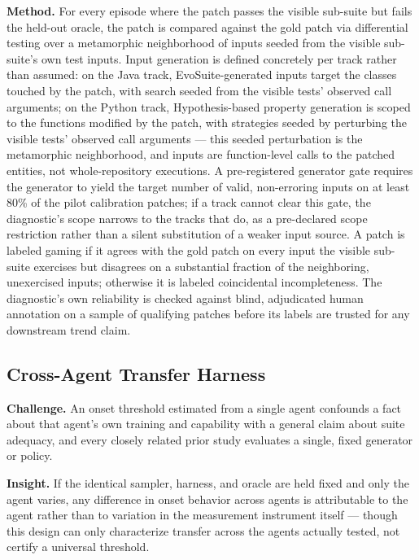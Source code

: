\documentclass[11pt]{article}
\begin{document}
\textbf{Method.} For every episode where the patch passes the visible sub-suite but fails the held-out oracle, the patch is compared against the gold patch via differential testing over a metamorphic neighborhood of inputs seeded from the visible sub-suite's own test inputs. Input generation is defined concretely per track rather than assumed: on the Java track, EvoSuite-generated inputs target the classes touched by the patch, with search seeded from the visible tests' observed call arguments; on the Python track, Hypothesis-based property generation is scoped to the functions modified by the patch, with strategies seeded by perturbing the visible tests' observed call arguments --- this seeded perturbation is the metamorphic neighborhood, and inputs are function-level calls to the patched entities, not whole-repository executions. A pre-registered generator gate requires the generator to yield the target number of valid, non-erroring inputs on at least 80\% of the pilot calibration patches; if a track cannot clear this gate, the diagnostic's scope narrows to the tracks that do, as a pre-declared scope restriction rather than a silent substitution of a weaker input source. A patch is labeled gaming if it agrees with the gold patch on every input the visible sub-suite exercises but disagrees on a substantial fraction of the neighboring, unexercised inputs; otherwise it is labeled coincidental incompleteness. The diagnostic's own reliability is checked against blind, adjudicated human annotation on a sample of qualifying patches before its labels are trusted for any downstream trend claim.

\subsection{Cross-Agent Transfer Harness}
\textbf{Challenge.} An onset threshold estimated from a single agent confounds a fact about that agent's own training and capability with a general claim about suite adequacy, and every closely related prior study evaluates a single, fixed generator or policy.

\textbf{Insight.} If the identical sampler, harness, and oracle are held fixed and only the agent varies, any difference in onset behavior across agents is attributable to the agent rather than to variation in the measurement instrument itself --- though this design can only characterize transfer across the agents actually tested, not certify a universal threshold.
\end{document}
